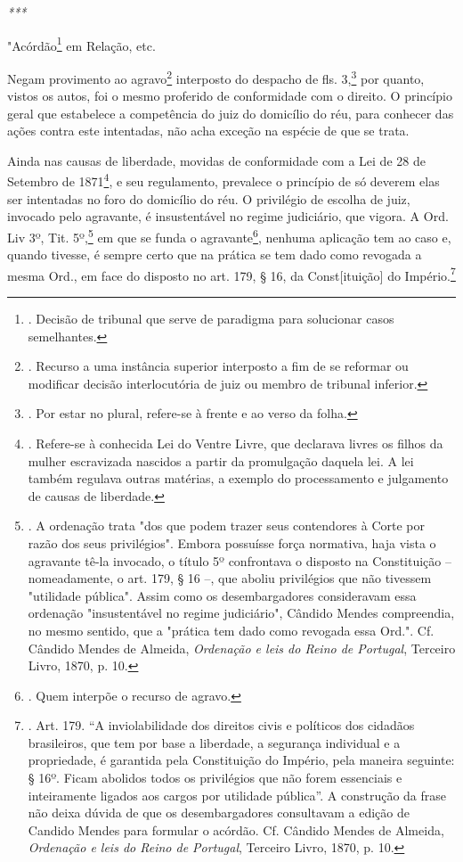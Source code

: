 \emph{***}

"Acórdão\footnote{. Decisão de tribunal que serve de paradigma para
  solucionar casos semelhantes.} em Relação, etc.

Negam provimento ao agravo\footnote{. Recurso a uma instância superior
  interposto a fim de se reformar ou modificar decisão interlocutória de
  juiz ou membro de tribunal inferior.} interposto do despacho de fls.
3,\footnote{. Por estar no plural, refere-se à frente e ao verso da
  folha.} por quanto, vistos os autos, foi o mesmo proferido de
conformidade com o direito. O princípio geral que estabelece a
competência do juiz do domicílio do réu, para conhecer das ações contra
este intentadas, não acha exceção na espécie de que se trata.

Ainda nas causas de liberdade, movidas de conformidade com a Lei de 28
de Setembro de 1871\footnote{. Refere-se à conhecida Lei do Ventre
  Livre, que declarava livres os filhos da mulher escravizada nascidos a
  partir da promulgação daquela lei. A lei também regulava outras
  matérias, a exemplo do processamento e julgamento de causas de
  liberdade.}, e seu regulamento, prevalece o princípio de só deverem
elas ser intentadas no foro do domicílio do réu. O privilégio de escolha
de juiz, invocado pelo agravante, é insustentável no regime judiciário,
que vigora. A Ord. Liv 3º, Tit. 5º,\footnote{. A ordenação trata "dos
  que podem trazer seus contendores à Corte por razão dos seus
  privilégios". Embora possuísse força normativa, haja vista o agravante
  tê-la invocado, o título 5º confrontava o disposto na Constituição --
  nomeadamente, o art. 179, § 16 --, que aboliu privilégios que não
  tivessem "utilidade pública". Assim como os desembargadores
  consideravam essa ordenação "insustentável no regime judiciário",
  Cândido Mendes compreendia, no mesmo sentido, que a "prática tem dado
  como revogada essa Ord.". Cf. Cândido Mendes de Almeida,
  \emph{Ordenação e leis do Reino de Portugal}, Terceiro Livro, 1870, p.
  10.} em que se funda o agravante\footnote{. Quem interpõe o recurso de
  agravo.}, nenhuma aplicação tem ao caso e, quando tivesse, é sempre
certo que na prática se tem dado como revogada a mesma Ord., em face do
disposto no art. 179, § 16, da Const{[}ituição{]} do Império.\footnote{.
  Art. 179. ``A inviolabilidade dos direitos civis e políticos dos
  cidadãos brasileiros, que tem por base a liberdade, a segurança
  individual e a propriedade, é garantida pela Constituição do Império,
  pela maneira seguinte: § 16º. Ficam abolidos todos os privilégios que
  não forem essenciais e inteiramente ligados aos cargos por utilidade
  pública''. A construção da frase não deixa dúvida de que os
  desembargadores consultavam a edição de Candido Mendes para formular o
  acórdão. Cf. Cândido Mendes de Almeida, \emph{Ordenação e leis do
  Reino de Portugal}, Terceiro Livro, 1870, p. 10.}

